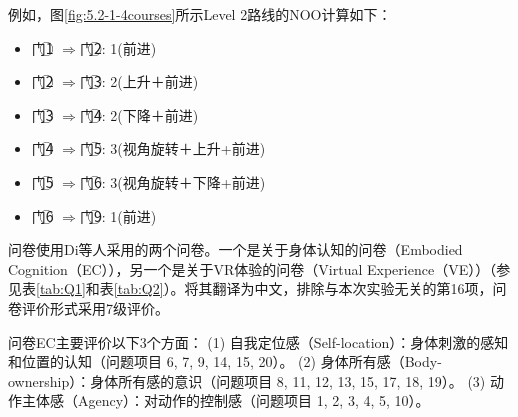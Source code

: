 例如，图\ref{fig:5.2-1-4courses}所示Level 2路线的NOO计算如下：

\begin{itemize}
    \item 门\textcircled{1} $\Rightarrow$门\textcircled{2}: 1(前进)
    \item 门\textcircled{2} $\Rightarrow$门\textcircled{3}: 2(上升＋前进)
    \item 门\textcircled{3} $\Rightarrow$门\textcircled{4}: 2(下降＋前进)
    \item 门\textcircled{4} $\Rightarrow$门\textcircled{5}: 3(视角旋转＋上升+前进)
    \item 门\textcircled{5} $\Rightarrow$门\textcircled{6}: 3(视角旋转＋下降+前进)
    \item 门\textcircled{6} $\Rightarrow$门\textcircled{9}: 1(前进)
\end{itemize}

问卷使用Di等人\cites{di2022natural}采用的两个问卷。一个是关于身体认知的问卷（Embodied Cognition（EC）），另一个是关于VR体验的问卷（Virtual Experience（VE））（参见表\ref{tab:Q1}和表\ref{tab:Q2}）。将其翻译为中文，排除与本次实验无关的第16项，问卷评价形式采用7级评价。

问卷EC主要评价以下3个方面：
(1) 自我定位感（Self-location）：身体刺激的感知和位置的认知（问题项目 6, 7, 9, 14, 15, 20）。
(2) 身体所有感（Body-ownership）：身体所有感的意识（问题项目 8, 11, 12, 13, 15, 17, 18, 19）。
(3) 动作主体感（Agency）：对动作的控制感（问题项目 1, 2, 3, 4, 5, 10）。

